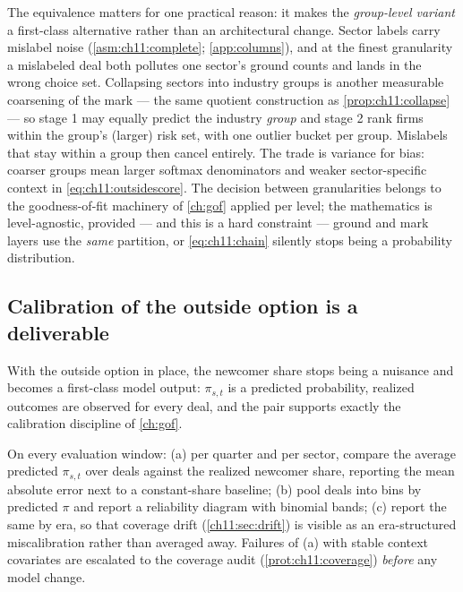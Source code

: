The equivalence matters for one practical reason: it makes the
\emph{group-level variant} a first-class alternative rather than an
architectural change. Sector labels carry mislabel noise
(\cref{asm:ch11:complete}; \cref{app:columns}), and at the finest
granularity a mislabeled deal both pollutes one sector's ground counts
and lands in the wrong choice set. Collapsing sectors into industry
groups is another measurable coarsening of the mark --- the same quotient
construction as \cref{prop:ch11:collapse} --- so stage 1 may equally
predict the industry \emph{group} and stage 2 rank firms within the
group's (larger) risk set, with one outlier bucket per group. Mislabels
that stay within a group then cancel entirely. The trade is variance for
bias: coarser groups mean larger softmax denominators and weaker
sector-specific context in \cref{eq:ch11:outsidescore}. The decision
between granularities belongs to the goodness-of-fit machinery of
\cref{ch:gof} applied per level; the mathematics is level-agnostic,
provided --- and this is a hard constraint --- ground and mark layers use
the \emph{same} partition, or \cref{eq:ch11:chain} silently stops being
a probability distribution.

\subsection{Calibration of the outside option is a deliverable}\label{ch11:sec:calibration}

With the outside option in place, the newcomer share stops being a
nuisance and becomes a first-class model output: $\pi_{s,t}$ is a
predicted probability, realized outcomes are observed for every deal, and
the pair supports exactly the calibration discipline of \cref{ch:gof}.

\begin{protocol}\label{prot:ch11:reliability}
On every evaluation window: (a) per quarter and per sector, compare the
average predicted $\pi_{s,t}$ over deals against the realized newcomer
share, reporting the mean absolute error next to a constant-share
baseline; (b) pool deals into bins by predicted $\pi$ and
report a reliability diagram with binomial bands; (c) report the same by
era, so that coverage drift (\cref{ch11:sec:drift}) is visible as an
era-structured miscalibration rather than averaged away. Failures of (a)
with stable context covariates are escalated to the coverage audit
(\cref{prot:ch11:coverage}) \emph{before} any model change.
\end{protocol}

